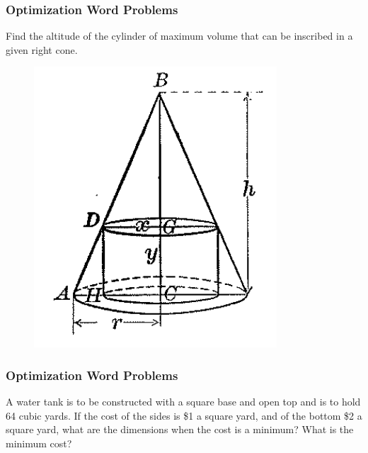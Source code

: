 \documentclass[xcolor=dvipsnames]{beamer}
\begin{document}
\begin{frame}
  \frametitle{Optimization Word Problems}
{\ubung} Find the altitude of the cylinder of maximum volume that can
be inscribed in a given right cone.
  \begin{figure}[h]
    \includegraphics[scale=.3]{./diagrams/optcone.png}
  \end{figure}
\end{frame}

\begin{frame}
  \frametitle{Optimization Word Problems}
  {\ubung} A water tank is to be constructed with a square base and
  open top and is to hold 64 cubic yards. If the cost of the sides is
  \$1 a square yard, and of the bottom \$2 a square yard, what are the
  dimensions when the cost is a minimum? What is the minimum cost?
\end{frame}
\end{document}
